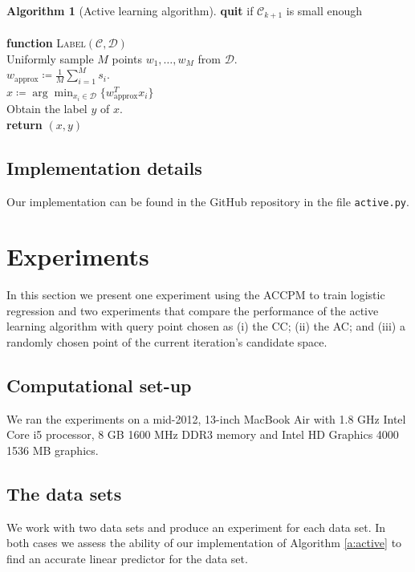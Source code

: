 \documentclass[11pt]{amsart}
\theoremstyle{definition}
\newtheorem{algorithm}{Algorithm}
\theoremstyle{remark}
\newcommand{\ind}{\hspace*{0.5cm}}
\newcommand{\transpose}{T}
\begin{document}
\begin{algorithm}[Active learning algorithm]
            \ind\ind \textbf{quit} if $\mathcal{C}_{k+1}$ is small enough \\ \\
            \ind \textbf{function} \textsc{Label}$(\mathcal{C}, \mathcal{D})$ \\
            \ind\ind Uniformly sample $M$ points $w_1, \dots, w_M$ from $\mathcal{D}$. \\
            \ind\ind $w_\text{approx} \coloneqq \frac{1}{M} \sum_{i=1}^M s_i$. \\
            \ind\ind $x \coloneqq \arg \min_{x_i \in \mathcal{D}} \{w_\text{approx}^\transpose x_i \}$ \\
            \ind\ind Obtain the label $y$ of $x$. \\
            \ind \textbf{return} $(x, y) $     
            \end{algorithm}
        \subsection{Implementation details} Our implementation can be found in the GitHub repository in the file \texttt{active.py}.

\section{Experiments}
    In this section we present one experiment using the ACCPM to train logistic regression and two experiments that compare the performance of the active learning algorithm with query point chosen as (i) the CC; (ii) the AC; and (iii) a randomly chosen point of the current iteration's candidate space. 

    \subsection{Computational set-up} 
        We ran the experiments on a mid-2012, 13-inch MacBook Air with 1.8 GHz Intel Core i5 processor, 8 GB 1600 MHz DDR3 memory and Intel HD Graphics 4000 1536 MB graphics.
    \subsection{The data sets} 
        We work with two data sets and produce an experiment for each data set. In both cases we assess the ability of our implementation of Algorithm \ref{a:active} to find an accurate linear predictor for the data set. 
        
\end{document}
